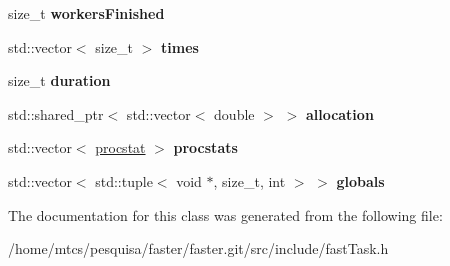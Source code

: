 \begin{DoxyCompactItemize}
size\+\_\+t {\bfseries workers\+Finished}
\item 
\hypertarget{classfaster_1_1fastTask_ad59378ade0ac559f412c726137eac964}{}\label{classfaster_1_1fastTask_ad59378ade0ac559f412c726137eac964} 
std\+::vector$<$ size\+\_\+t $>$ {\bfseries times}
\item 
\hypertarget{classfaster_1_1fastTask_a2b7537638f460ca40f9c539aa4950379}{}\label{classfaster_1_1fastTask_a2b7537638f460ca40f9c539aa4950379} 
size\+\_\+t {\bfseries duration}
\item 
\hypertarget{classfaster_1_1fastTask_a84768f55711ad87949579bf0c2ae8783}{}\label{classfaster_1_1fastTask_a84768f55711ad87949579bf0c2ae8783} 
std\+::shared\+\_\+ptr$<$ std\+::vector$<$ double $>$ $>$ {\bfseries allocation}
\item 
\hypertarget{classfaster_1_1fastTask_aac49582ce19072b081c72492c3a819e0}{}\label{classfaster_1_1fastTask_aac49582ce19072b081c72492c3a819e0} 
std\+::vector$<$ \hyperlink{classfaster_1_1procstat}{procstat} $>$ {\bfseries procstats}
\item 
\hypertarget{classfaster_1_1fastTask_a7e0e6d2663f6b913ba7467d4a3810b06}{}\label{classfaster_1_1fastTask_a7e0e6d2663f6b913ba7467d4a3810b06} 
std\+::vector$<$ std\+::tuple$<$ void $\ast$, size\+\_\+t, int $>$ $>$ {\bfseries globals}
\end{DoxyCompactItemize}


The documentation for this class was generated from the following file\+:\begin{DoxyCompactItemize}
\item 
/home/mtcs/pesquisa/faster/faster.\+git/src/include/fast\+Task.\+h\end{DoxyCompactItemize}

